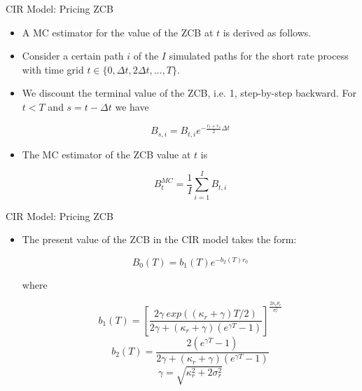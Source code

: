 \documentclass[11pt]{beamer}
\begin{document}
\begin{frame}{CIR Model: Pricing ZCB}
\begin{itemize}
\item A MC estimator for the value of the ZCB at $t$ is derived as follows. 

\item Consider a certain path $i$ of the $I$ simulated paths for the short rate process with time grid $t \in \{0,\Delta t, 2\Delta t, \dots, T \}$. 

\item We discount the terminal value of the ZCB, i.e. 1, step-by-step backward. For $t < T$ and $s = t - \Delta t$ we have

$$
B_{s,i} = B_{t,i} e^{-\frac{r_t+r_s}{2}\Delta t}
$$

\item The MC estimator of the ZCB value at $t$ is

$$
B_t^{MC} = \frac{1}{I} \sum\limits_{i=1}^I B_{t,i}
$$
\end{itemize}
\end{frame}
\begin{frame}{CIR Model: Pricing ZCB}
\begin{itemize}
\item The present value of the ZCB in the CIR model takes the form:

$$
B_0(T) = b_1(T) e^{-b_2(T)r_0}
$$

where 

$$
b_1(T) = \left[
\frac{2\gamma \> exp((\kappa_r + \gamma)T/2)}{2\gamma + (\kappa_r + \gamma)(e^{\gamma T}-1)}
\right]^{\frac{2\kappa_r \theta_r}{\sigma^2_r}}
$$
$$
b_2(T) = \frac{2(e^{\gamma T} -1)}{2\gamma + (\kappa_r + \gamma)(e^{\gamma T} -1)}
$$
$$
\gamma = \sqrt{\kappa_r^2 + 2 \sigma^2_r}
$$
\end{itemize}
\end{frame}
\end{document}
